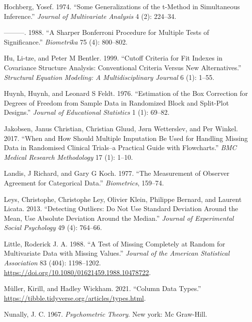 \documentclass[
  letterpaper,
]{krantz}
\newlength{\cslhangindent}
\newenvironment{CSLReferences}[2] %
 {\begin{list}{}{%
  \setlength{\itemindent}{0pt}
  \setlength{\leftmargin}{0pt}
  \setlength{\parsep}{0pt}
  \ifodd #1
   \setlength{\leftmargin}{\cslhangindent}
   \setlength{\itemindent}{-1\cslhangindent}
  \fi
  \setlength{\itemsep}{#2\baselineskip}}}
 {\end{list}}
\begin{document}
\begin{CSLReferences}{1}{0}
Hochberg, Yosef. 1974. {``Some Generalizations of the t-Method in
Simultaneous Inference.''} \emph{Journal of Multivariate Analysis} 4
(2): 224--34.

---------. 1988. {``A Sharper Bonferroni Procedure for Multiple Tests of
Significance.''} \emph{Biometrika} 75 (4): 800--802.

Hu, Li-tze, and Peter M Bentler. 1999. {``Cutoff Criteria for Fit
Indexes in Covariance Structure Analysis: Conventional Criteria Versus
New Alternatives.''} \emph{Structural Equation Modeling: A
Multidisciplinary Journal} 6 (1): 1--55.

Huynh, Huynh, and Leonard S Feldt. 1976. {``Estimation of the Box
Correction for Degrees of Freedom from Sample Data in Randomized Block
and Split-Plot Designs.''} \emph{Journal of Educational Statistics} 1
(1): 69--82.

Jakobsen, Janus Christian, Christian Gluud, Jørn Wetterslev, and Per
Winkel. 2017. {``When and How Should Multiple Imputation Be Used for
Handling Missing Data in Randomised Clinical Trials--a Practical Guide
with Flowcharts.''} \emph{BMC Medical Research Methodology} 17 (1):
1--10.

Landis, J Richard, and Gary G Koch. 1977. {``The Measurement of Observer
Agreement for Categorical Data.''} \emph{Biometrics}, 159--74.

Leys, Christophe, Christophe Ley, Olivier Klein, Philippe Bernard, and
Laurent Licata. 2013. {``Detecting Outliers: Do Not Use Standard
Deviation Around the Mean, Use Absolute Deviation Around the Median.''}
\emph{Journal of Experimental Social Psychology} 49 (4): 764--66.

Little, Roderick J. A. 1988. {``A Test of Missing Completely at Random
for Multivariate Data with Missing Values.''} \emph{Journal of the
American Statistical Association} 83 (404): 1198--1202.
\url{https://doi.org/10.1080/01621459.1988.10478722}.

Müller, Kirill, and Hadley Wickham. 2021. {``Column Data Types.''}
\url{https://tibble.tidyverse.org/articles/types.html}.

Nunally, J. C. 1967. \emph{Psychometric Theory}. New york: Mc Graw-Hill.


\end{CSLReferences}
\end{document}

